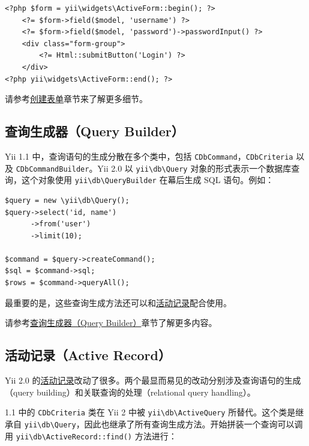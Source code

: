 \lstset{language=php}\begin{lstlisting}
<?php $form = yii\widgets\ActiveForm::begin(); ?>
    <?= $form->field($model, 'username') ?>
    <?= $form->field($model, 'password')->passwordInput() ?>
    <div class="form-group">
        <?= Html::submitButton('Login') ?>
    </div>
<?php yii\widgets\ActiveForm::end(); ?>
\end{lstlisting}
请参考\hyperref[input-forms.md]{创建表单}章节来了解更多细节。

\subsection{查询生成器（Query Builder）}
Yii 1.1 中，查询语句的生成分散在多个类中，包括 \lstinline|CDbCommand|，\lstinline|CDbCriteria| 以及 \lstinline|CDbCommandBuilder|。Yii 2.0 以 \texttt{yii{\allowbreak{}\textbackslash}db{\allowbreak{}\textbackslash}Query} 对象的形式表示一个数据库查询，这个对象使用 \texttt{yii{\allowbreak{}\textbackslash}db{\allowbreak{}\textbackslash}QueryBuilder} 在幕后生成 SQL 语句。例如：

\lstset{language=php}\begin{lstlisting}
$query = new \yii\db\Query();
$query->select('id, name')
      ->from('user')
      ->limit(10);

$command = $query->createCommand();
$sql = $command->sql;
$rows = $command->queryAll();
\end{lstlisting}
最重要的是，这些查询生成方法还可以和\hyperref[db-active-record.md]{活动记录}配合使用。

请参考\hyperref[db-query-builder.md]{查询生成器（Query Builder）}章节了解更多内容。

\subsection{活动记录（Active Record）}
Yii 2.0 的\hyperref[db-active-record.md]{活动记录}改动了很多。两个最显而易见的改动分别涉及查询语句的生成（query building）和关联查询的处理（relational query handling）。

1.1 中的 \lstinline|CDbCriteria| 类在 Yii 2 中被 \texttt{yii{\allowbreak{}\textbackslash}db{\allowbreak{}\textbackslash}ActiveQuery} 所替代。这个类是继承自 \texttt{yii{\allowbreak{}\textbackslash}db{\allowbreak{}\textbackslash}Query}，因此也继承了所有查询生成方法。开始拼装一个查询可以调用 \texttt{yii{\allowbreak{}\textbackslash}db{\allowbreak{}\textbackslash}ActiveRecord\allowbreak{}::\allowbreak{}find()} 方法进行：

